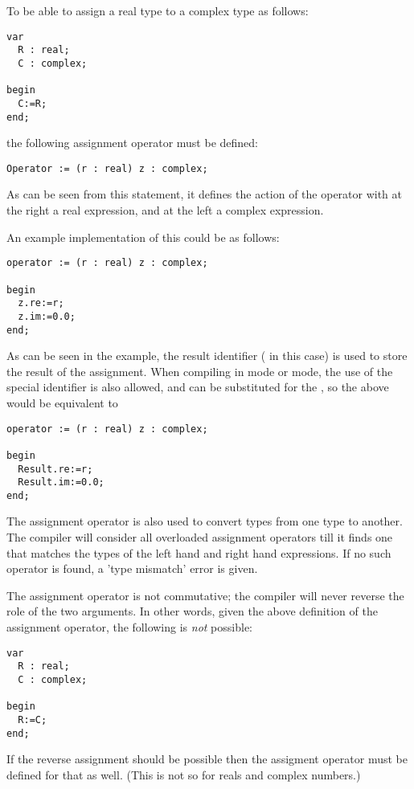 To be able to assign a real type to a complex type as follows:
\begin{verbatim}
var
  R : real;
  C : complex;

begin
  C:=R;
end;
\end{verbatim}
the following assignment operator must be defined:
\begin{verbatim}
Operator := (r : real) z : complex;
\end{verbatim}
As can be seen from this statement, it defines the action of the operator
\var{:=} with at the right a real expression, and at the left a complex
expression.

An example implementation of this could be as follows:
\begin{verbatim}
operator := (r : real) z : complex;

begin
  z.re:=r;
  z.im:=0.0;
end;
\end{verbatim}
As can be seen in the example, the result identifier ( in this case)
is used to store the result of the assignment. When compiling in  mode
or  mode, the use of the special identifier  is also
allowed, and can be substituted for the , so the above would be
equivalent to
\begin{verbatim}
operator := (r : real) z : complex;

begin
  Result.re:=r;
  Result.im:=0.0;
end;
\end{verbatim}

The assignment operator is also used to convert types from one type to
another. The compiler will consider all overloaded assignment operators
till it finds one that matches the types of the left hand and right hand
expressions. If no such operator is found, a 'type mismatch' error
is given.

\begin{remark}
The assignment operator is not commutative; the compiler will never reverse
the role of the two arguments. In other words, given the above definition of
the assignment operator, the following is {\em not} possible:
\begin{verbatim}
var
  R : real;
  C : complex;

begin
  R:=C;
end;
\end{verbatim}
If the reverse assignment should be possible then the assigment operator 
must be defined for that as well.
(This is not so for reals and complex numbers.)
\end{remark}

